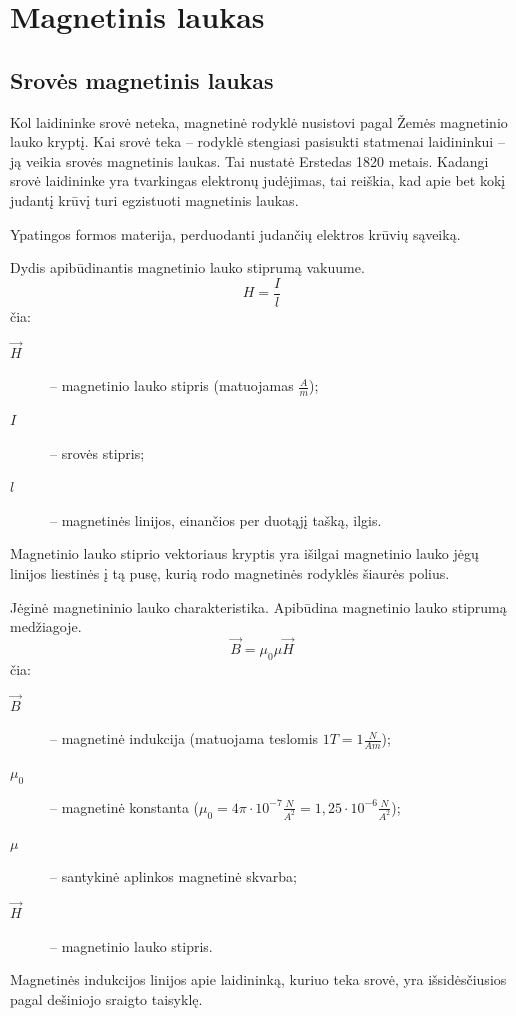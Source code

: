 \section{Magnetinis laukas}

\subsection{Srovės magnetinis laukas}

Kol laidininke srovė neteka, magnetinė rodyklė nusistovi pagal Žemės
magnetinio lauko kryptį. Kai srovė teka – rodyklė stengiasi pasisukti
statmenai laidininkui – ją veikia srovės magnetinis laukas. Tai nustatė
Erstedas 1820 metais. Kadangi srovė laidininke yra tvarkingas elektronų
judėjimas, tai reiškia, kad apie bet kokį judantį krūvį turi egzistuoti
magnetinis laukas.

\begin{defn}
  Ypatingos formos materija, perduodanti judančių elektros krūvių
  sąveiką.
\end{defn}

\begin{defn}
  Dydis apibūdinantis magnetinio lauko stiprumą vakuume.
  \begin{equation*}
    H = \frac{I}{l}
  \end{equation*}
  čia:
  \begin{description}
    \item[$\vec{H}$] – magnetinio lauko stipris (matuojamas $\frac{A}{m}$);
    \item[$I$] – srovės stipris;
    \item[$l$] – magnetinės linijos, einančios per duotąjį tašką, ilgis.
  \end{description}
  Magnetinio lauko stiprio vektoriaus kryptis yra išilgai magnetinio
  lauko jėgų linijos liestinės į tą pusę, kurią rodo magnetinės rodyklės
  šiaurės polius.
\end{defn}

\begin{defn}
  Jėginė magnetininio lauko charakteristika. Apibūdina magnetinio lauko
  stiprumą medžiagoje.
  \begin{equation*}
    \vec{B} = \mu_{0} \mu \vec{H}
  \end{equation*}
  čia:
  \begin{description}
    \item[$\vec{B}$] – magnetinė indukcija (matuojama teslomis
      $1T = 1\frac{N}{Am}$);
    \item[$\mu_{0}$] – magnetinė konstanta 
      ($\mu_{0} = 4\pi \cdot 10^{-7} \frac{N}{A^{2}} = 1,25 \cdot 10^{-6} 
      \frac{N}{A^{2}}$);
    \item[$\mu$] – santykinė aplinkos magnetinė skvarba;
    \item[$\vec{H}$] – magnetinio lauko stipris.
  \end{description}
  Magnetinės indukcijos linijos apie laidininką, kuriuo teka srovė, yra
  išsidėsčiusios pagal dešiniojo sraigto taisyklę.
\end{defn}

